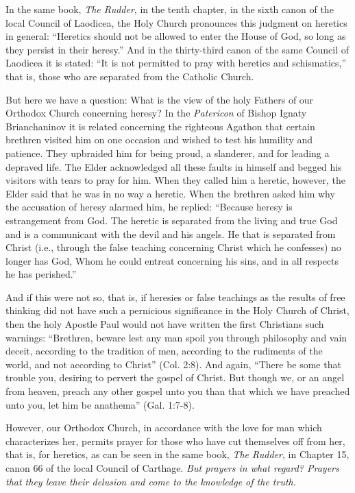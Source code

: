 In the same book, \textit{The Rudder}, in the tenth chapter, in the sixth canon of the local Council of Laodicea, the Holy Church pronounces this judgment on heretics in general: ``Heretics should not be allowed to enter the House of God, so long as they persist in their heresy.'' And in the thirty-third canon of the same Council of Laodicea it is stated: ``It is not permitted to pray with heretics and schismatics,'' that is, those who are separated from the Catholic Church.

But here we have a question: What is the view of the holy Fathers of our Orthodox Church concerning heresy? In the \textit{Patericon} of Bishop Ignaty Brianchaninov it is related concerning the righteous Agathon that certain brethren visited him on one occasion and wished to test his humility and patience. They upbraided him for being proud, a slanderer, and for leading a depraved life. The Elder acknowledged all these faults in himself and begged his visitors with tears to pray for him. When they called him a heretic, however, the Elder said that he was in no way a heretic. When the brethren asked him why the accusation of heresy alarmed him, he replied: ``Because heresy is estrangement from God. The heretic is separated from the living and true God and is a communicant with the devil and his angels. He that is separated from Christ (i.e., through the false teaching concerning Christ which he confesses) no longer has God, Whom he could entreat concerning his sins, and in all respects he has perished.''

And if this were not so, that is, if heresies or false teachings as the results of free thinking did not have such a pernicious significance in the Holy Church of Christ, then the holy Apostle Paul would not have written the first Christians such warnings: ``Brethren, beware lest any man spoil you through philosophy and vain deceit, according to the tradition of men, according to the rudiments of the world, and not according to Christ'' (Col. 2:8). And again, ``There be some that trouble you, desiring to pervert the gospel of Christ. But though we, or an angel from heaven, preach any other gospel unto you than that which we have preached unto you, let him be anathema'' (Gal. 1:7-8).

However, our Orthodox Church, in accordance with the love for man which characterizes her, permits prayer for those who have cut themselves off from her, that is, for heretics, as can be seen in the same book, \textit{The Rudder}, in Chapter 15, canon 66 of the local Council of Carthage. \textit{But prayers in what regard? Prayers that they leave their delusion and come to the knowledge of the truth.}

